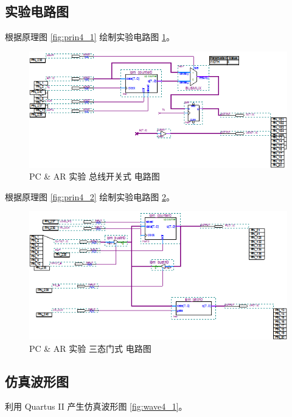 \subsection{实验电路图}

根据原理图 \ref{fig:prin4_1} 绘制实验电路图 \ref{fig:bdf4_1}。

\begin{figure}[H]
\centering
\includegraphics[width=\textwidth]{images/bdf4_1.png}
\caption{PC \& AR 实验 总线开关式 电路图}
\label{fig:bdf4_1}
\end{figure}

根据原理图 \ref{fig:prin4_2} 绘制实验电路图 \ref{fig:bdf4_2}。

\begin{figure}[H]
\centering
\includegraphics[width=\textwidth]{images/bdf4_2.png}
\caption{PC \& AR 实验 三态门式 电路图}
\label{fig:bdf4_2}
\end{figure}

\subsection{仿真波形图}

利用 Quartus II 产生仿真波形图 \ref{fig:wave4_1}。

